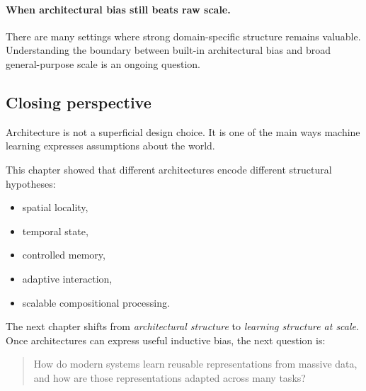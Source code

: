 \paragraph{When architectural bias still beats raw scale.}
There are many settings where strong domain-specific structure remains valuable.
Understanding the boundary between built-in architectural bias and broad general-purpose scale is an ongoing question.

\subsection*{Closing perspective}

Architecture is not a superficial design choice.
It is one of the main ways machine learning expresses assumptions about the world.

\medskip

This chapter showed that different architectures encode different structural hypotheses:
\begin{itemize}
    \item spatial locality,
    \item temporal state,
    \item controlled memory,
    \item adaptive interaction,
    \item scalable compositional processing.
\end{itemize}

The next chapter shifts from \emph{architectural structure} to \emph{learning structure at scale}.
Once architectures can express useful inductive bias, the next question is:

\begin{quote}
How do modern systems learn reusable representations from massive data, and how are those representations adapted across many tasks?
\end{quote}